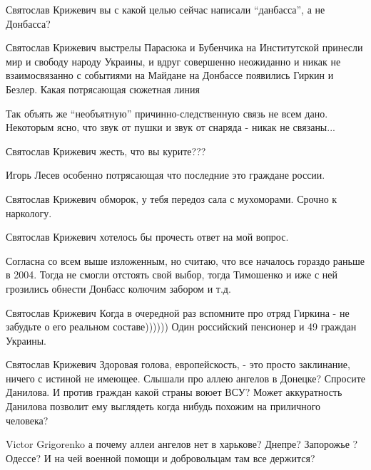 \begin{itemize}
\begin{itemize}

Святослав Крижевич вы с какой целью сейчас написали \enquote{данбасса}, а не Донбасса?


Святослав Крижевич выстрелы Парасюка и Бубенчика на Институтской принесли мир и
свободу народу Украины, и вдруг совершенно неожиданно и никак не взаимосвязанно
с событиями на Майдане на Донбассе появились Гиркин и Безлер. Какая потрясающая
сюжетная линия


Так объять же \enquote{необъятную} причинно-следственную связь не всем дано.
Некоторым ясно, что звук от пушки и звук от снаряда - никак не связаны...


Святослав Крижевич жесть, что вы курите???


Игорь Лесев особенно потрясающая что последние это граждане россии.


Святослав Крижевич обморок, у тебя передоз сала с мухоморами. Срочно к наркологу.


Святослав Крижевич хотелось бы прочесть ответ на мой вопрос.


Согласна со всем выше изложенным, но считаю, что все началось гораздо раньше в
2004. Тогда не смогли отстоять свой выбор, тогда Тимошенко и иже с ней
грозились обнести Донбасс колючим забором и т.д.


Святослав Крижевич Когда в очередной раз вспомните про отряд Гиркина - не
забудьте о его реальном составе)))))) Один российский пенсионер и 49 граждан
Украины.


Святослав Крижевич Здоровая голова, европейскость, - это просто заклинание,
ничего с истиной не имеющее. Слышали про аллею ангелов в Донецке? Спросите
Данилова. И против граждан какой страны воюет ВСУ? Может аккуратность Данилова
позволит ему выглядеть когда нибудь похожим на приличного человека?


Victor Grigorenko а почему аллеи ангелов нет в харькове? Днепре? Запорожье ?
Одессе? И на чей военной помощи и добровольцам там все держится?


\end{itemize}
\end{itemize}
